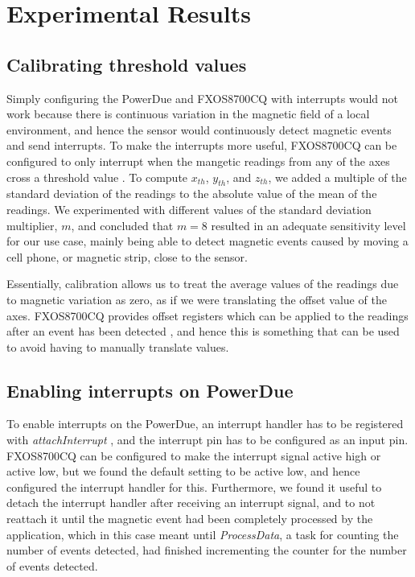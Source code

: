 \section{Experimental Results}
\subsection{Calibrating threshold values}
\label{sec:calibrate}

Simply configuring the PowerDue and FXOS8700CQ with interrupts would not work
because there is continuous variation in the magnetic field of a local
environment, and hence the sensor would continuously detect magnetic events and
send interrupts. To make the interrupts more useful, FXOS8700CQ can be
configured to only interrupt when the mangetic readings from any of the axes
cross a threshold value \cite{DatasheetSPI}. To compute $x_{th}$, $y_{th}$, and
$z_{th}$, we added a multiple of the standard deviation of the readings to the
absolute value of the mean of the readings. We experimented with different
values of the standard deviation multiplier, $m$, and concluded that $m = 8$
resulted in an adequate sensitivity level for our use case, mainly being able to
detect magnetic events caused by moving a cell phone, or magnetic strip, close
to the sensor.

Essentially, calibration allows us to treat the average values of the readings
due to magnetic variation as zero, as if we were translating the offset value of
the axes. FXOS8700CQ  provides offset registers which can be applied to the
readings after an event has been detected \cite{DatasheetSPI}, and hence this is
something that can be used to avoid having to manually translate values.

\subsection{Enabling interrupts on PowerDue}
\label{sec:powerdue_int}

To enable interrupts on the PowerDue, an interrupt handler has to be registered
with \textit{attachInterrupt} \cite{InterruptRef}, and the interrupt pin has to
be configured as an input pin. FXOS8700CQ can be configured to make the
interrupt signal active high or active low, but we found the default setting to
be active low, and hence configured the interrupt handler for this. Furthermore,
we found it useful to detach the interrupt handler after receiving an interrupt
signal, and to not reattach it until the magnetic event had been completely
processed by the application, which in this case meant until
\textit{ProcessData}, a task for counting the number of events detected, had
finished incrementing the counter for the number of events detected.


